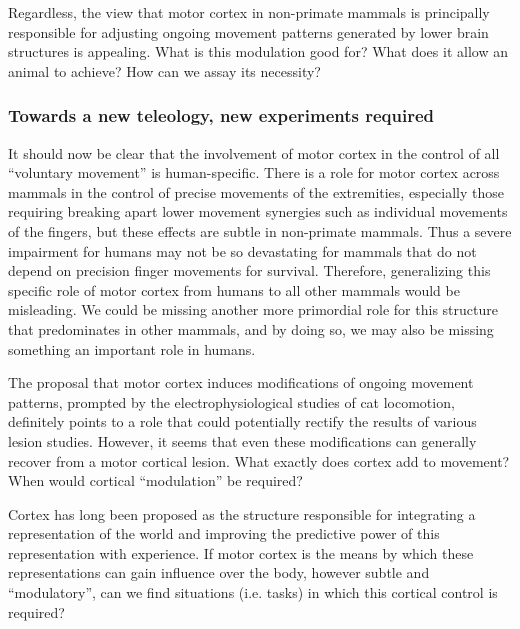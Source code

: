 Regardless, the view that motor cortex in non-primate mammals is principally responsible for adjusting ongoing movement patterns generated by lower brain structures is appealing. What is this modulation good for? What does it allow an animal to achieve? How can we assay its necessity?

\subsubsection*{Towards a new teleology, new experiments required}

It should now be clear that the involvement of motor cortex in the control of all ``voluntary movement'' is human-specific. There is a role for motor cortex across mammals in the control of precise movements of the extremities, especially those requiring breaking apart lower movement synergies such as individual movements of the fingers, but these effects are subtle in non-primate mammals. Thus a severe impairment for humans may not be so devastating for mammals that do not depend on precision finger movements for survival. Therefore, generalizing this specific role of motor cortex from humans to all other mammals would be misleading. We could be missing another more primordial role for this structure that predominates in other mammals, and by doing so, we may also be missing something an important role in humans.

The proposal that motor cortex induces modifications of ongoing movement patterns, prompted by the electrophysiological studies of cat locomotion, definitely points to a role that could potentially rectify the results of various lesion studies. However, it seems that even these modifications can generally recover from a motor cortical lesion. What exactly does cortex add to movement? When would cortical ``modulation'' be required?

Cortex has long been proposed as the structure responsible for integrating a representation of the world and improving the predictive power of this representation with experience. If motor cortex is the means by which these representations can gain influence over the body, however subtle and ``modulatory'', can we find situations (i.e. tasks) in which this cortical control is required?

